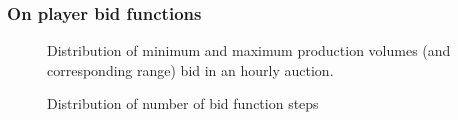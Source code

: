 \begin{subappendices}
\subsubsection{On player bid functions}
\begin{figure}[H]
\begin{center}
\caption{Distribution of minimum and maximum production volumes (and corresponding range) bid in an hourly auction.}
\label{g9a}
\end{center}
\end{figure}
\begin{figure}[H]
\begin{center}
\caption{Distribution of number of bid function steps}
\label{steps}
\end{center}
\end{figure}



\end{subappendices}

